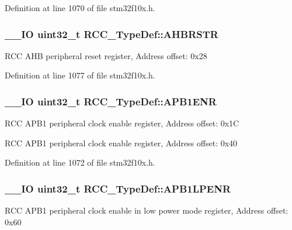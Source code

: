 Definition at line 1070 of file stm32f10x.\-h.

\hypertarget{struct_r_c_c___type_def_a46a098b026c5e85770e7a7f05a35d49c}{
\subsubsection[{A\-H\-B\-R\-S\-T\-R}]{\setlength{\rightskip}{0pt plus 5cm}\-\_\-\-\_\-\-I\-O {\bf uint32\-\_\-t} R\-C\-C\-\_\-\-Type\-Def\-::\-A\-H\-B\-R\-S\-T\-R}}\label{struct_r_c_c___type_def_a46a098b026c5e85770e7a7f05a35d49c}
R\-C\-C A\-H\-B peripheral reset register, Address offset\-: 0x28 

Definition at line 1077 of file stm32f10x.\-h.

\hypertarget{struct_r_c_c___type_def_aec7622ba90341c9faf843d9ee54a759f}{
\subsubsection[{A\-P\-B1\-E\-N\-R}]{\setlength{\rightskip}{0pt plus 5cm}\-\_\-\-\_\-\-I\-O {\bf uint32\-\_\-t} R\-C\-C\-\_\-\-Type\-Def\-::\-A\-P\-B1\-E\-N\-R}}\label{struct_r_c_c___type_def_aec7622ba90341c9faf843d9ee54a759f}
R\-C\-C A\-P\-B1 peripheral clock enable register, Address offset\-: 0x1\-C

R\-C\-C A\-P\-B1 peripheral clock enable register, Address offset\-: 0x40 

Definition at line 1072 of file stm32f10x.\-h.

\hypertarget{struct_r_c_c___type_def_a5c8e710c40b642dcbf296201a7ecb2da}{
\subsubsection[{A\-P\-B1\-L\-P\-E\-N\-R}]{\setlength{\rightskip}{0pt plus 5cm}\-\_\-\-\_\-\-I\-O {\bf uint32\-\_\-t} R\-C\-C\-\_\-\-Type\-Def\-::\-A\-P\-B1\-L\-P\-E\-N\-R}}\label{struct_r_c_c___type_def_a5c8e710c40b642dcbf296201a7ecb2da}
R\-C\-C A\-P\-B1 peripheral clock enable in low power mode register, Address offset\-: 0x60 

